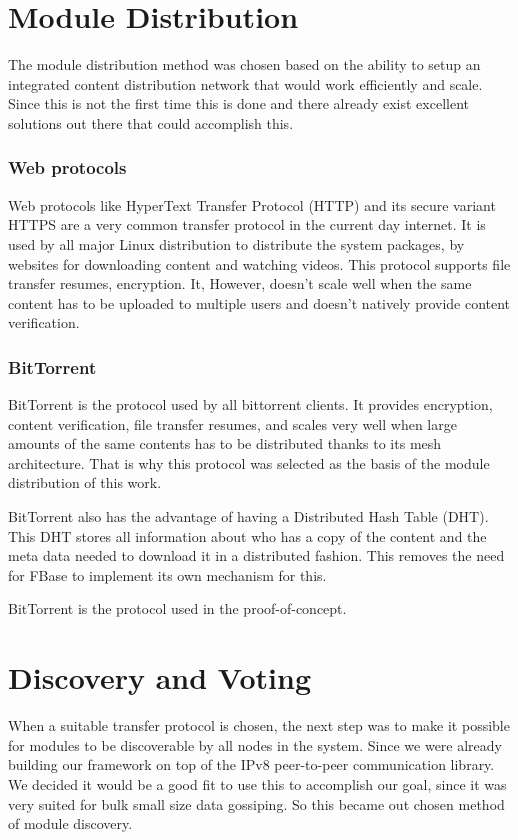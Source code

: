 \section{Module Distribution}
 The module distribution method was chosen based on the ability to setup an integrated content distribution network that would work efficiently and scale. Since this is not the first time this is done and there already exist excellent solutions out there that could accomplish this.

\subsubsection{\textbf{Web protocols}}

Web protocols like HyperText Transfer Protocol (HTTP) and its secure variant HTTPS are a very common transfer protocol in the current day internet. It is used by all major Linux distribution to distribute the system packages, by websites for downloading content and watching videos. This protocol supports file transfer resumes, encryption. It, However, doesn't scale well when the same content has to be uploaded to multiple users and doesn't natively provide content verification.

\subsubsection{\textbf{BitTorrent}}

BitTorrent is the protocol used by all bittorrent clients. It provides encryption, content verification, file transfer resumes, and scales very well when large amounts of the same contents has to be distributed thanks to its mesh architecture. That is why this protocol was selected as the basis of the module distribution of this work.

BitTorrent also has the advantage of having a Distributed Hash Table (DHT). This DHT stores all information about who has a copy of the content and the meta data needed to download it in a distributed fashion. This removes the need for FBase to implement its own mechanism for this.

BitTorrent is the protocol used in the proof-of-concept.

\section{Discovery and Voting}

When a suitable transfer protocol is chosen, the next step was to make it possible for modules to be discoverable by all nodes in the system. Since we were already building our framework on top of the IPv8 peer-to-peer communication library. We decided it would be a good fit to use this to accomplish our goal, since it was very suited for bulk small size data gossiping. So this became out chosen method of module discovery.

